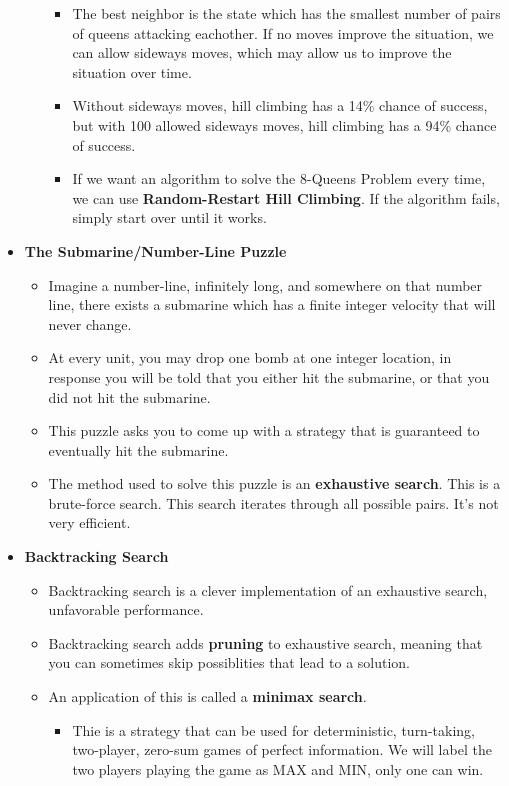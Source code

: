 \documentclass{article}
\begin{document}
\begin{itemize}
\begin{itemize}
\begin{itemize}
            \item The best neighbor is the state which has the smallest number of pairs of queens attacking eachother. If no moves improve the situation, we can allow sideways moves, which may allow us to improve the situation over time.
            \item Without sideways moves, hill climbing has a 14\% chance of success, but with 100 allowed sideways moves, hill climbing has a 94\% chance of success.
            \item If we want an algorithm to solve the 8-Queens Problem every time, we can use \textbf{Random-Restart Hill Climbing}. If the algorithm fails, simply start over until it works.
    \end{itemize}
\end{itemize}
\item \textbf{The Submarine/Number-Line Puzzle}
    \begin{itemize}
        \item Imagine a number-line, infinitely long, and somewhere on that number line, there exists a submarine which has a finite integer velocity that will never change.
        \item At every unit, you may drop one bomb at one integer location, in response you will be told that you either hit the submarine, or that you did not hit the submarine.
        \item This puzzle asks you to come up with a strategy that is guaranteed to eventually hit the submarine.
        \item The method used to solve this puzzle is an \textbf{exhaustive search}. This is a brute-force search. This search iterates through all possible pairs. It's not very efficient.
    \end{itemize}
\item \textbf{Backtracking Search}
    \begin{itemize}
        \item Backtracking search is a clever implementation of an exhaustive search, unfavorable performance.
        \item Backtracking search adds \textbf{pruning} to exhaustive search, meaning that you can sometimes skip possiblities that lead to a solution.
        \item An application of this is called a \textbf{minimax search}.
        \begin{itemize}
            \item Thie is a strategy that can be used for deterministic, turn-taking, two-player, zero-sum games of perfect information. We will label the two players playing the game as MAX and MIN, only one can win.

\end{itemize}
\end{itemize}
\end{itemize}
\end{document}
